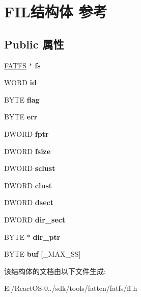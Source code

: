 \hypertarget{struct_f_i_l}{}\section{F\+I\+L结构体 参考}
\label{struct_f_i_l}
\subsection*{Public 属性}
\begin{DoxyCompactItemize}
\item 
\mbox{\label{struct_f_i_l_a42376a6797a06228911c8b836c1e9030}} 
\hyperlink{struct_f_a_t_f_s}{F\+A\+T\+FS} $\ast$ {\bfseries fs}
\item 
\mbox{\label{struct_f_i_l_af7cae0063b0045fb7078b560101ba8f2}} 
W\+O\+RD {\bfseries id}
\item 
\mbox{\label{struct_f_i_l_ac409508881f5a16f2998ae675072b376}} 
B\+Y\+TE {\bfseries flag}
\item 
\mbox{\label{struct_f_i_l_aea440945db26de9c4a88065c0c887fda}} 
B\+Y\+TE {\bfseries err}
\item 
\mbox{\label{struct_f_i_l_a75d29cf9257c827d117887b9f924c4a9}} 
D\+W\+O\+RD {\bfseries fptr}
\item 
\mbox{\label{struct_f_i_l_aa00790d40d7b0081c345fd4f76e22b70}} 
D\+W\+O\+RD {\bfseries fsize}
\item 
\mbox{\label{struct_f_i_l_ad308b74c8d6975c6a9c30d90b4124c40}} 
D\+W\+O\+RD {\bfseries sclust}
\item 
\mbox{\label{struct_f_i_l_aa41312aba551b9a6d1c9d3c8c7d2734b}} 
D\+W\+O\+RD {\bfseries clust}
\item 
\mbox{\label{struct_f_i_l_ab3d4165d6fd32ac71a130d835fbf0b4d}} 
D\+W\+O\+RD {\bfseries dsect}
\item 
\mbox{\label{struct_f_i_l_ab203794f939ad4480e81dfa488770783}} 
D\+W\+O\+RD {\bfseries dir\+\_\+sect}
\item 
\mbox{\label{struct_f_i_l_a5af9e9fb312b629220eaf684dd28c4a9}} 
B\+Y\+TE $\ast$ {\bfseries dir\+\_\+ptr}
\item 
\mbox{\label{struct_f_i_l_a7a95fb86588663e48309b5cded7e207b}} 
B\+Y\+TE {\bfseries buf} \mbox{[}\+\_\+\+M\+A\+X\+\_\+\+SS\mbox{]}
\end{DoxyCompactItemize}


该结构体的文档由以下文件生成\+:\begin{DoxyCompactItemize}
\item 
E\+:/\+React\+O\+S-\/0../sdk/tools/fatten/fatfs/ff.\+h\end{DoxyCompactItemize}
